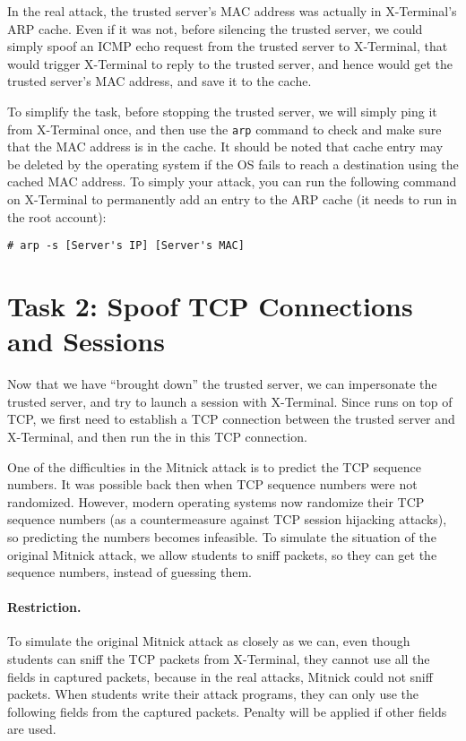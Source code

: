 In the real attack, the trusted server's MAC address was actually in X-Terminal's ARP
cache. Even if it was not, before silencing the trusted server, 
we could simply spoof an ICMP echo request from the trusted 
server to X-Terminal, that would trigger X-Terminal to reply to 
the trusted server, and hence would get the trusted server's MAC address, and 
save it to the cache. 


To simplify the task, before stopping the trusted server, 
we will simply ping it from X-Terminal once, and then use 
the \texttt{arp} command to check and make sure that
the MAC address is in the cache. It should be noted that 
cache entry may be deleted by the operating system if 
the OS fails to reach a destination using 
the cached MAC address. To simply your attack, 
you can run the following command on X-Terminal to
permanently add an entry to the ARP cache (it needs to
run in the root account):

\begin{lstlisting}
# arp -s [Server's IP] [Server's MAC]
\end{lstlisting}



\section{Task 2: Spoof TCP Connections and \rsh Sessions}
\label{sec:task2}

Now that we have ``brought down'' the trusted server, we can impersonate the trusted
server, and try to launch a \rsh session  
with X-Terminal. Since \rsh runs on top of TCP, we first need to 
establish a TCP connection between the trusted server and X-Terminal,
and then run the \rsh in this TCP connection.  


One of the difficulties in the Mitnick attack is to predict the TCP sequence numbers. 
It was possible back then when TCP sequence numbers were not randomized. 
However, modern operating systems now randomize their TCP sequence numbers
(as a countermeasure against TCP session hijacking attacks), so
predicting the numbers becomes infeasible.
To simulate the situation of the original Mitnick attack, we 
allow students to sniff packets, so
they can get the sequence numbers, instead of guessing them.  

\paragraph{Restriction.} To simulate the original Mitnick attack
as closely as we can, even though students can sniff
the TCP packets from X-Terminal, they cannot use all the 
fields in captured packets, because in the real attacks,
Mitnick could not sniff packets. When students write their 
attack programs, they can only use the 
following fields from the captured packets. Penalty will be 
applied if other fields are used.


